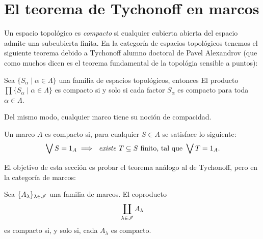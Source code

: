 \chapter{El teorema de Tychonoff en marcos}

Un espacio topológico es  \emph{compacto} si cualquier cubierta
abierta del espacio admite una subcubierta finita.
En la categoría de espacios topológicos tenemos el siguiente 
teorema debido a Tychonoff alumno doctoral de Pavel Alexandrov (que como muchos dicen es el teorema fundamental de la topológia sensible a puntos):

\begin{theorem*}
  Sea $\{S_{\alpha}\mid\alpha\in\Lambda\}$ una familia de espacios topológicos, entonces
  El producto $\prod\{S_{\alpha}\mid\alpha\in\Lambda\}$ es compacto si y solo si cada factor $S_{\alpha}$ es compacto para toda $\alpha\in\Lambda$.


\end{theorem*}

Del mismo modo, cualquier marco tiene su noción de compacidad.
\begin{defn}
Un marco $A$ es compacto si, para cualquier $S\in A$
se satisface lo siguiente:
\[
    \bigvee S= 1_A
    \implies
    \textit{ existe } T\subseteq S\text{ finito, tal que }
    \bigvee T= 1_A
.\]
\end{defn}
El objetivo de esta sección es probar el teorema análogo
al de Tychonoff, pero en la categoría de marcos:
\begin{thm}
    Sea $\{A_\lambda\}_{\lambda\in\mathscr{I}}$ una familia de marcos.
    El coproducto
    \[
        \coprod_{\lambda\in\mathscr{I}}A_\lambda
    \]
    es compacto si, y solo si, cada $A_\lambda$ es compacto.
\end{thm}

